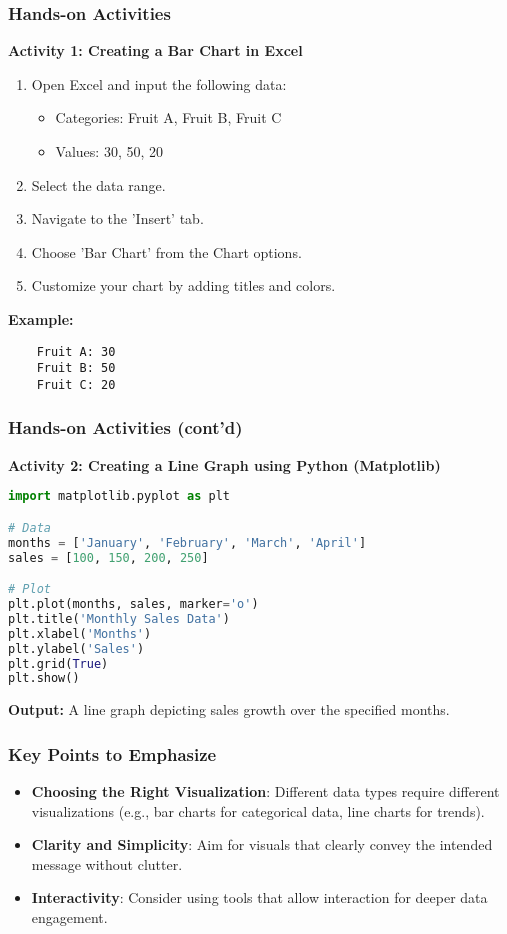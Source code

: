 \documentclass[aspectratio=169]{beamer}
\begin{document}
\begin{frame}[fragile]
    \frametitle{Hands-on Activities}
    \textbf{Activity 1: Creating a Bar Chart in Excel}
    \begin{enumerate}
        \item Open Excel and input the following data:
            \begin{itemize}
                \item Categories: Fruit A, Fruit B, Fruit C
                \item Values: 30, 50, 20
            \end{itemize}
        \item Select the data range.
        \item Navigate to the 'Insert' tab.
        \item Choose 'Bar Chart' from the Chart options.
        \item Customize your chart by adding titles and colors.
    \end{enumerate}
    \vspace{1em}
    \textbf{Example:}
    \begin{verbatim}
    Fruit A: 30
    Fruit B: 50
    Fruit C: 20
    \end{verbatim}
\end{frame}

\begin{frame}[fragile]
    \frametitle{Hands-on Activities (cont'd)}
    \textbf{Activity 2: Creating a Line Graph using Python (Matplotlib)}
    \begin{lstlisting}[language=Python]
import matplotlib.pyplot as plt

# Data
months = ['January', 'February', 'March', 'April']
sales = [100, 150, 200, 250]

# Plot
plt.plot(months, sales, marker='o')
plt.title('Monthly Sales Data')
plt.xlabel('Months')
plt.ylabel('Sales')
plt.grid(True)
plt.show()
    \end{lstlisting}
    \vspace{1em}
    \textbf{Output:} A line graph depicting sales growth over the specified months.
\end{frame}

\begin{frame}[fragile]
    \frametitle{Key Points to Emphasize}
    \begin{itemize}
        \item \textbf{Choosing the Right Visualization}: Different data types require different visualizations (e.g., bar charts for categorical data, line charts for trends).
        \item \textbf{Clarity and Simplicity}: Aim for visuals that clearly convey the intended message without clutter.
        \item \textbf{Interactivity}: Consider using tools that allow interaction for deeper data engagement.
    \end{itemize}
\end{frame}
\end{document}
